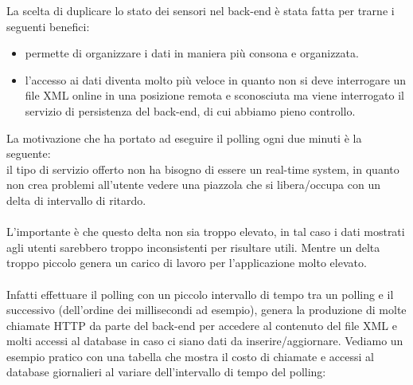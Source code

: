 La scelta di duplicare lo stato dei sensori nel \gls{back-end} è stata fatta per trarne i seguenti benefici:
\begin{itemize}
    \item permette di organizzare i dati in maniera più consona e organizzata.
    \item l'accesso ai dati diventa molto più veloce in quanto non si deve interrogare un file \gls{XML} online
        in una posizione remota e sconosciuta ma viene interrogato il servizio di persistenza del \gls{back-end}, 
        di cui abbiamo pieno controllo.
\end{itemize}
\leavevmode\newline
La motivazione che ha portato ad eseguire il polling ogni due minuti è la seguente:
\\
il tipo di servizio offerto non ha bisogno di essere un \gls{real-time system}\glsfirstoccur, in quanto non crea problemi all'utente
vedere una piazzola che si libera/occupa con un delta di intervallo di ritardo. 
\\\\
L'importante è che questo delta non sia troppo elevato, in tal caso i dati mostrati agli utenti sarebbero troppo
inconsistenti per risultare utili. Mentre un delta troppo piccolo genera un carico di lavoro per l'applicazione molto
elevato.
\\\\
Infatti effettuare il polling con un piccolo intervallo di tempo tra un polling e il successivo (dell'ordine dei millisecondi
ad esempio),
genera la produzione di molte 
chiamate \gls{HTTP} da parte del \gls{back-end} per accedere al contenuto del file \gls{XML} e molti accessi al database in caso ci siano dati da 
inserire/aggiornare.
\clearpage
\leavevmode\newline
Vediamo un esempio pratico con una tabella che mostra il costo di chiamate e accessi al database giornalieri al variare 
dell'intervallo di tempo del polling:

